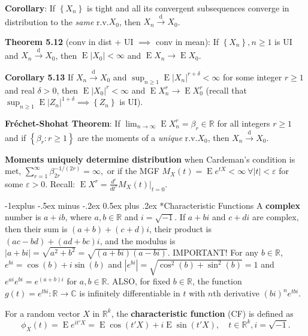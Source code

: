 \documentclass[paper=letter,fontsize=2.89mm]{scrartcl}
\makeatletter
\DeclareMathOperator{\E}{E}
\newcommand{\convdist}{\stackrel{\text{d}}{\longrightarrow}}
\newcommand{\eps}{\varepsilon}
\newcommand{\R}{\mathbb{R}}
\newcommand{\C}{\mathbb{C}}
\newcommand\abs[1]{\left| #1 \right|}
\newcommand\set[1]{\left\{ #1 \right\}}
\renewcommand{\subsection}{\@startsection{subsection}{2}{0mm}%
                                {-1explus -.5ex minus -.2ex}%
                                {0.5ex plus .2ex}%
                                {\normalfont\normalsize\bfseries}}
\makeatother
\begin{document}
\begin{multicols*}{3}
\textbf{Corollary}: If $\set{X_n}$ is tight and all its convergent subsequences converge in distribution to the \emph{same} r.v.\@ $X_0$, then $X_n \convdist X_0$.  \\ \medskip

\textbf{Theorem 5.12} (conv in dist + UI $\implies$ conv in mean): If $\set{X_n}, n\ge1$ is UI and $X_n \convdist X_0$, then $\E\abs{X_0} < \infty$ and $\E X_n \to \E X_0$. \\ \medskip

\textbf{Corollary 5.13}
If $X_n \convdist X_0$ and $\sup_{n\ge1} \E\abs{X_n}^{r+\delta} < \infty$ for some integer $r \ge 1$ and real $\delta > 0$, then $\E\abs{X_0}^r < \infty$ and $\E X_n^r \to \E X_0^r$ (recall that $\sup_{n\ge1} \E\abs{Z_n}^{1+\delta} \implies \set{Z_n}$ is UI). \\ \medskip 

\textbf{Fr\'{e}chet-Shohat Theorem}: If $\lim_{n\to\infty} \E X_n^r = \beta_r \in \R$ for all integers $r \ge 1$ and if $\set{\beta_r: r \ge 1}$ are the moments of a \emph{unique} r.v.\@ $X_0$, then $X_n \convdist X_0$. \\ \medskip

\textbf{Moments uniquely determine distribution} when Cardeman's condition is met, $\sum_{r=1}^\infty \beta_{2r}^{-1/(2r)} = \infty,$ or if the MGF $M_X(t) = \E e^{tX} < \infty ~ \forall \abs{t} < \eps$ for some $\eps > 0$. Recall: $\E X^r = \frac{d^r}{dt^r} M_X(t) \bigg|_{t=0}.$ \\ \medskip

\subsection*{Characteristic Functions}
A \textbf{complex} number is $a + ib$, where $a,b \in \R$ and $i = \sqrt{-1}$. If $a + bi$ and $c + di$ are complex, then their sum is $(a + b) + (c+d)i$, their product is $(ac - bd) + (ad + bc)i$, and the modulus is $\abs{a + bi} = \sqrt{a^2 + b^2} = \sqrt{(a+bi)(a-bi)}$. IMPORTANT! For any $b \in \R$, $e^{bi} = \cos(b) + i \sin(b)$
and $\abs{e^{bi}} = \sqrt{\cos^2(b) + \sin^2(b)} =1$ and $e^{ai}e^{bi} = e^{(a+b)i}$ for $a,b\in\R$. ALSO, for fixed $b \in \R$, the function $g(t) = e^{tbi}: \R \to \C$ is infinitely differentiable in $t$ with $n$th derivative $(bi)^n e^{tbi}$. \\ \medskip

For a random vector $X$ in $\R^k$, the \textbf{characteristic function} (CF) is defined as
$$\phi_X(t) = \E e^{it'X} = \E \cos(t'X) + i \E \sin(t'X), \quad t\in \R^k, i = \sqrt{-1}.$$


\end{multicols*}
\end{document}
